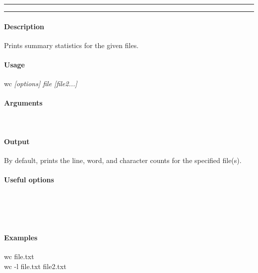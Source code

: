 \hrule
\vspace{1mm}
\hrule
\vspace{4mm}

\paragraph{Description}
\indentpar \raggedright \textrm{Prints summary statistics for the given files.}\\

\paragraph{Usage}
\indentpar wc \textit{[options] file [file2...]}

\paragraph{Arguments}
\indentpar {}\\
\indentpar {}

\paragraph{Output}
\indentpar \textrm{By default, prints the line, word, and character counts for the specified file(s).}

\paragraph{Useful options}
\indentpar {}\\
\indentpar {}\\
\indentpar {}\\
\indentpar {}


\paragraph{Examples}

\indentpar wc file.txt\\
\indentpar wc -l file.txt file2.txt

\vspace{20mm}